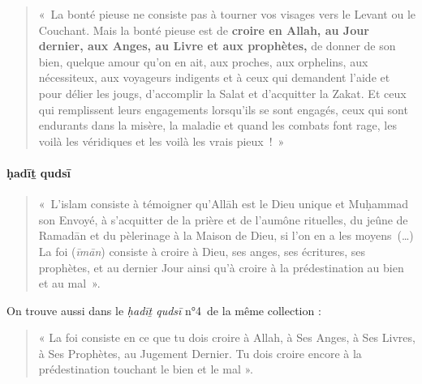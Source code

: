 \begin{quote}
«~La bonté pieuse ne consiste pas à tourner vos visages vers le Levant
ou le Couchant. Mais la bonté pieuse est de \textbf{croire en Allah, au
Jour dernier, aux Anges, au Livre et aux prophètes,} de donner de son
bien, quelque amour qu'on en ait, aux proches, aux orphelins, aux
nécessiteux, aux voyageurs indigents et à ceux qui demandent l'aide et
pour délier les jougs, d'accomplir la Salat et d'acquitter la Zakat. Et
ceux qui remplissent leurs engagements lorsqu'ils se sont engagés, ceux
qui sont endurants dans la misère, la maladie et quand les combats font
rage, les voilà les véridiques et les voilà les vrais pieux~!~»
\end{quote}
\begin{quote}

    
\end{quote}
 
\paragraph{ḥadīṯ qudsī}


    
\begin{quote}
«~L'islam consiste à témoigner qu'Allāh est le Dieu unique et Muḥammad
son Envoyé, à s'acquitter de la prière et de l'aumône rituelles, du
jeûne de Ramadān et du pèlerinage à la Maison de Dieu, si l'on en a les
moyens~(\ldots) La foi (\emph{īmān}) consiste à croire à Dieu, ses
anges, ses écritures, ses prophètes, et au dernier Jour ainsi qu'à
croire à la prédestination au bien et au mal~».
\end{quote}
On trouve aussi dans le \emph{ḥadīṯ qudsī} n°4~de la même collection :
\begin{quote}
« La foi consiste en ce que tu dois croire à Allah, à Ses Anges, à Ses
Livres, à Ses Prophètes, au Jugement Dernier. Tu dois croire encore à la
prédestination touchant le bien et le mal ».
\end{quote}


